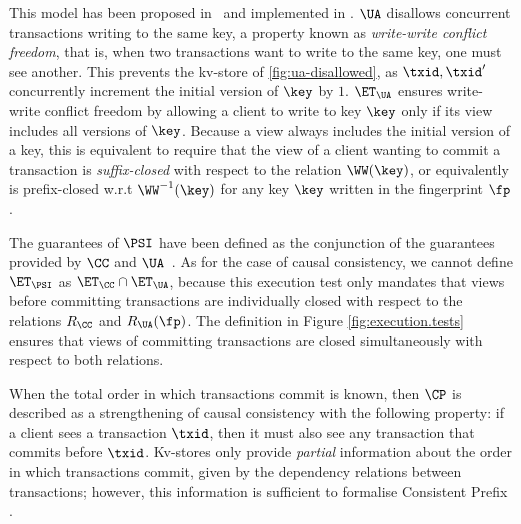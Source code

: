 This model has been proposed in~\cite{framework-concur} 
and implemented in \cite{rola}.
$\UA$ disallows concurrent transactions writing to the same key,
a property known as \emph{write-write conflict freedom}, that is, 
when two transactions want to write to the same key, one must see another.
This prevents the kv-store of \cref{fig:ua-disallowed},
as $\txid, \txid'$ concurrently increment the initial version of $\key$ by $1$.
$\ET_\UA$ ensures write-write conflict freedom by allowing a client to write to key $\key$
only if its view includes all versions of $\key$. Because a view always includes the 
initial version of a key, this is equivalent to require that the view of a client wanting 
to commit a transaction is \emph{suffix-closed} with respect to the relation $\WW(\key)$, 
or equivalently is prefix-closed w.r.t $\WW^{-1}(\key)$ for any key $\key$ written in the 
fingerprint $\fp$.

The guarantees of $\PSI$ have been defined as the conjunction of the guarantees provided by $\CC$ and $\UA$~\cite{framework-concur}. 
As for the case of causal consistency, we cannot define $\ET_{\PSI}$ as $\ET_{\CC} \cap \ET_{\UA}$, because 
this execution test only mandates that views before committing transactions are individually closed with respect to 
the relations $R_{\CC}$ and $R_{\UA}(\fp)$. The definition in Figure \ref{fig:execution.tests} ensures that 
views of committing transactions are closed simultaneously with respect to both relations.

\label{para:cp}
When the total order in which transactions commit is known, then 
$\CP$ is described as a strengthening of causal consistency with the following property: 
if a client sees a transaction $\txid$,
then it must also see any transaction that commits before $\txid$. 
Kv-stores only provide {\em partial} information about the order in which transactions commit, 
given by the dependency relations between transactions; however, 
this information is sufficient to formalise Consistent Prefix \cite{laws}.


